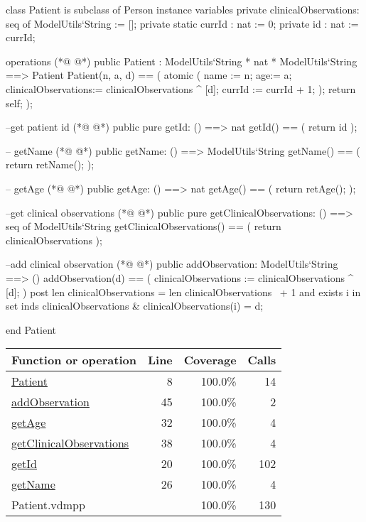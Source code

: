\begin{vdmpp}[breaklines=true]
class Patient is subclass of Person
instance variables
 private clinicalObservations: seq of ModelUtils`String := [];
 private static currId : nat := 0;
 private id : nat := currId;
 
operations
(*@
\label{Patient:8}
@*)
 public Patient : ModelUtils`String * nat * ModelUtils`String ==> Patient
 Patient(n, a, d) == (
  atomic (
   name := n;
   age:= a;
   clinicalObservations:= clinicalObservations ^ [d];
   currId := currId + 1;
  );
  return self;
 );
  
 --get patient id
(*@
\label{getId:20}
@*)
 public pure getId: () ==> nat
 getId() == (
  return id
 );
 
 -- getName
(*@
\label{getName:26}
@*)
  public getName: () ==> ModelUtils`String
  getName() == (
    return retName();  
  );

  -- getAge 
(*@
\label{getAge:32}
@*)
  public getAge: () ==> nat
  getAge() == (
    return retAge();  
  );
  
 --get clinical observations
(*@
\label{getClinicalObservations:38}
@*)
 public pure getClinicalObservations: () ==> seq of ModelUtils`String
 getClinicalObservations() == (
  return clinicalObservations
 );
 
 
 --add clinical observation
(*@
\label{addObservation:45}
@*)
 public addObservation: ModelUtils`String ==> ()
 addObservation(d) == (
  clinicalObservations := clinicalObservations ^ [d];
 )
 post len clinicalObservations = len clinicalObservations~ + 1 and
    exists i in set inds clinicalObservations & clinicalObservations(i) = d;
 
 
end Patient
\end{vdmpp}
\bigskip
\begin{longtable}{|l|r|r|r|}
\hline
Function or operation & Line & Coverage & Calls \\
\hline
\hline
\hyperref[Patient:8]{Patient} & 8&100.0\% & 14 \\
\hline
\hyperref[addObservation:45]{addObservation} & 45&100.0\% & 2 \\
\hline
\hyperref[getAge:32]{getAge} & 32&100.0\% & 4 \\
\hline
\hyperref[getClinicalObservations:38]{getClinicalObservations} & 38&100.0\% & 4 \\
\hline
\hyperref[getId:20]{getId} & 20&100.0\% & 102 \\
\hline
\hyperref[getName:26]{getName} & 26&100.0\% & 4 \\
\hline
\hline
Patient.vdmpp & & 100.0\% & 130 \\
\hline
\end{longtable}


